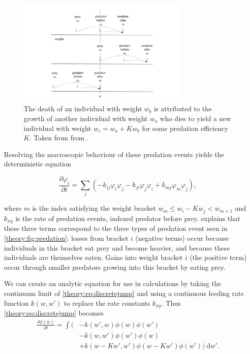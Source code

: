 \documentclass[../main.tex]{subfiles}
\begin{document}
  \begin{figure}[ht]
    \centering
    \caption{The death of an individual with weight $w_b$ is attributed to the growth of another individual with weight $w_a$ who dies to yield a new individual with weight $w_c = w_a + K w_b$ for some predation efficiency $K$. Taken from from \cite{datta2010}. \label{theory:fig:predation}}
    \includegraphics[width=0.75\textwidth]{_assets/stochastic_predation.png}
  \end{figure}

  Resolving the macroscopic behaviour of these predation events yields the deterministic equation

  \begin{equation}\label{theory:eq:discretejump}
    \frac{\partial \varphi_i}{\partial t} = \sum_j \left(- k_{ij} \varphi_i \varphi_j - k_{ji} \varphi_j \varphi_i + k_{mj} \varphi_m \varphi_j \right),
  \end{equation}

  where $m$ is the index satisfying the weight bracket $w_m \leq w_i - K w_j < w_{m+1}$ and $k_{xy}$ is the rate of predation events, indexed predator before prey. \cite{datta2010} explains that these three terms correspond to the three types of predation event seen in \autoref{theory:fig:predation}: losses from bracket $i$ (negative terms) occur because individuals in this bracket eat prey and become heavier, and because these individuals are themselves eaten. Gains into weight bracket $i$ (the positive term) occur through smaller predators growing into this bracket by eating prey.

  We can create an analytic equation for use in calculations by taking the continuum limit of \autoref{theory:eq:discretejump} and using a continuous feeding rate function $k(w, w')$ to replace the rate constants $k_{xy}$. Thus \autoref{theory:eq:discretejump} becomes
  \begin{align}\label{theory:eq:jumpgrowth}
    \frac{\partial \phi(w)}{\partial t}
    = \int ( &- k(w', w) \phi(w)\phi(w') \nonumber \\
    & - k(w, w')\phi(w')\phi(w) \nonumber \\
    & + k(w - Kw', w')\phi(w - Kw')\phi(w')) \: \mathrm{d}w'.
  \end{align}
\end{document}
